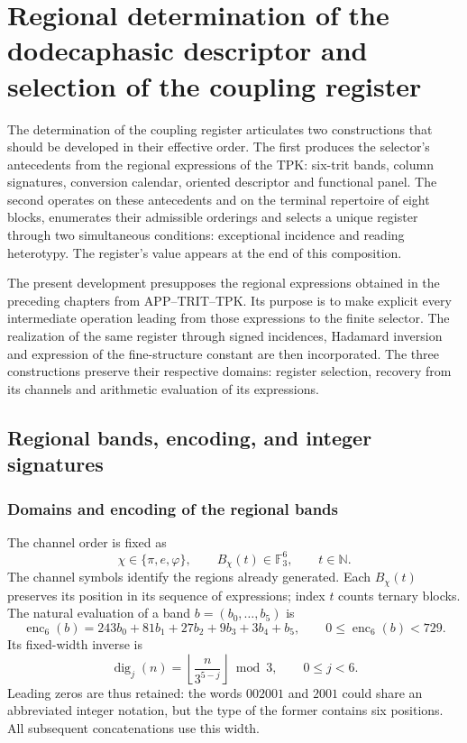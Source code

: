 \section{Regional determination of the dodecaphasic descriptor and selection of the coupling register}
\label{chap:despliegue-selector-k}

The determination of the coupling register articulates two constructions that should be developed in their effective order. The first produces the selector's antecedents from the regional expressions of the TPK: six-trit bands, column signatures, conversion calendar, oriented descriptor and functional panel. The second operates on these antecedents and on the terminal repertoire of eight blocks, enumerates their admissible orderings and selects a unique register through two simultaneous conditions: exceptional incidence and reading heterotypy. The register's value appears at the end of this composition.

The present development presupposes the regional expressions obtained in the preceding chapters from APP--TRIT--TPK. Its purpose is to make explicit every intermediate operation leading from those expressions to the finite selector. The realization of the same register through signed incidences, Hadamard inversion and expression of the fine-structure constant are then incorporated. The three constructions preserve their respective domains: register selection, recovery from its channels and arithmetic evaluation of its expressions.

\subsection{Regional bands, encoding, and integer signatures}

\subsubsection{Domains and encoding of the regional bands}

The channel order is fixed as
\[
 \chi\in\{\pi,e,\varphi\},
 \qquad B_\chi(t)\in\mathbb F_3^6,
 \qquad t\in\mathbb N.
\]
The channel symbols identify the regions already generated. Each $B_\chi(t)$ preserves its position in its sequence of expressions; index $t$ counts ternary blocks. The natural evaluation of a band $b=(b_0,\ldots,b_5)$ is
\begin{equation}
 \operatorname{enc}_6(b)=
 243b_0+81b_1+27b_2+9b_3+3b_4+b_5,
 \qquad 0\leq\operatorname{enc}_6(b)<729.
 \label{eq:kdes-enc6}
\end{equation}
Its fixed-width inverse is
\[
 \operatorname{dig}_j(n)=
 \left\lfloor\frac{n}{3^{5-j}}\right\rfloor\bmod3,
 \qquad 0\leq j<6.
\]
Leading zeros are thus retained: the words $002001$ and $2001$
could share an abbreviated integer notation, but the type of the
former contains six positions. All subsequent concatenations
use this width.

